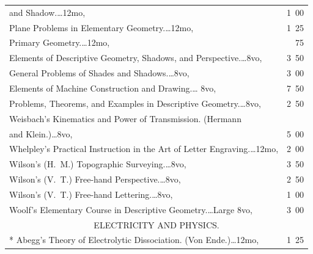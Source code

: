 \documentclass[a4paper,12pt]{book}[2004/02/16]
\theoremstyle{ilemma}
\theoremstyle{itheorem}
\theoremstyle{iother}
\theoremstyle{icorollary}
\theoremstyle{numcorollary}
\theoremstyle{idefinition}
\begin{document}
\begin{longtable}{@{}l@{ }r@{}}
\indent\indent and Shadow.\dotfill\ldots 12mo, &1\ 00\\

\indent Plane Problems in Elementary Geometry.\dotfill\ldots 12mo, &1\ 25\\

\indent Primary Geometry.\dotfill\ldots 12mo, &\ 75\\

\indent Elements of Descriptive Geometry, Shadows, and
Perspective.\dotfill\ldots 8vo, &3\ 50\\

\indent General Problems of Shades and Shadows.\dotfill\ldots 8vo, &3\ 00\\

\indent Elements of Machine Construction and Drawing.\dotfill\ldots
8vo, &7\ 50\\

\indent Problems, Theorems, and Examples in Descriptive
Geometry.\dotfill\ldots 8vo, &2\ 50\\

Weisbach's Kinematics and Power of Transmission. (Hermann\\

\nopagebreak

\indent\indent and Klein.)\dotfill\ldots 8vo, &5\ 00\\

Whelpley's Practical Instruction in the Art of Letter
Engraving.\dotfill\ldots 12mo, &2\ 00\\

Wilson's (H.~M.) Topographic Surveying.\dotfill\ldots 8vo, &3\ 50\\

Wilson's (V.~T.) Free-hand Perspective.\dotfill\ldots 8vo, &2\ 50\\

Wilson's (V.~T.) Free-hand Lettering.\dotfill\ldots 8vo, &1\ 00\\

Woolf's Elementary Course in Descriptive Geometry.\dotfill\ldots Large
8vo, &3\ 00\\[3em]



\multicolumn{2}{c}{\large ELECTRICITY AND PHYSICS.}\\[1em]

\nopagebreak

* Abegg's Theory of Electrolytic Dissociation. (Von
  Ende.)\dotfill\ldots 12mo, & 1\ 25 \\


\end{longtable}
\end{document}
